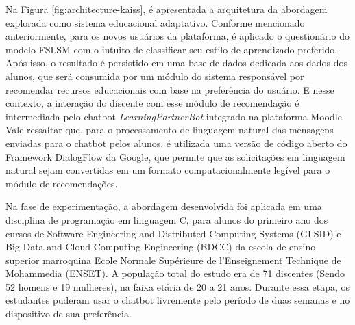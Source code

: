 Na Figura \ref{fig:architecture-kaiss}, é apresentada a arquitetura da abordagem explorada como sistema educacional adaptativo. Conforme mencionado anteriormente, para os novos usuários da plataforma, é aplicado o questionário do modelo FSLSM com o intuito de classificar seu estilo de aprendizado preferido. Após isso, o resultado é persistido em uma base de dados dedicada aos dados dos alunos, que será consumida por um módulo do sistema responsável por recomendar recursos educacionais com base na preferência do usuário. E nesse contexto, a interação do discente com esse módulo de recomendação é intermediada pelo chatbot \textit{LearningPartnerBot} integrado na plataforma Moodle. Vale ressaltar que, para o processamento de linguagem natural das mensagens enviadas para o chatbot pelos alunos, é utilizada uma versão de código aberto do Framework DialogFlow da Google, que permite que as solicitações em linguagem natural sejam convertidas em um formato computacionalmente legível para o módulo de recomendações.

\begin{figure}[ht] 
   	\captionsetup{width=16cm}
\end{figure}

Na fase de experimentação, a abordagem desenvolvida foi aplicada em uma disciplina de programação em linguagem C, para alunos do primeiro ano dos cursos de Software Engineering and Distributed Computing Systems (GLSID) e Big Data and Cloud Computing Engineering (BDCC) da escola de ensino superior marroquina Ecole Normale Supérieure de l’Enseignement Technique de Mohammedia (ENSET). A população total do estudo era de 71 discentes (Sendo 52 homens e 19 mulheres), na faixa etária de 20 a 21 anos. Durante essa etapa, os estudantes puderam usar o chatbot livremente pelo período de duas semanas e no dispositivo de sua preferência.

